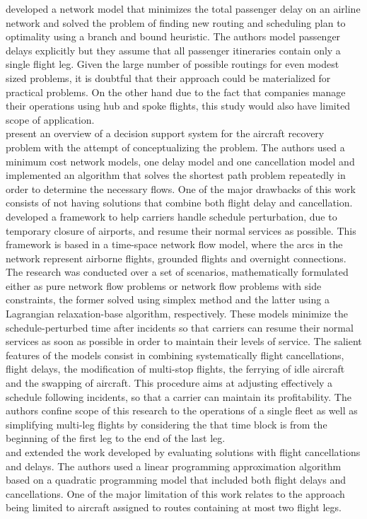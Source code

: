 \documentclass[ijoo,nonblindrev]{informs-ijoo}
\begin{document}
\citep{TEODOROVIC1984} developed a network model that minimizes the total passenger delay on an airline network and solved the problem of finding new routing and scheduling plan to optimality using a branch and bound heuristic. The authors model passenger delays explicitly but they assume that all passenger itineraries contain only a single flight leg. Given the large number of possible routings for even modest sized problems, it is doubtful that their approach could be materialized for practical problems. On the other hand due to the fact that companies manage their operations using hub and spoke flights, this study would also have limited scope of application.\\
\citep{Jarrah1993} present an overview of a decision support system for the aircraft recovery problem with the attempt of conceptualizing the problem. The authors used a minimum cost network models, one delay model and one cancellation model and implemented an algorithm that solves the shortest path problem repeatedly in order to determine the necessary flows. One of the major drawbacks of this work consists of not having solutions that combine both flight delay and cancellation.
\citep{Yan1997} developed a framework to help carriers handle schedule perturbation, due to temporary closure of airports, and resume their normal services as possible. This framework is based in a time-space network flow model, where the arcs in the network represent airborne flights, grounded flights and overnight connections. The research was conducted over a set of scenarios, mathematically formulated either as pure network flow problems or network flow problems with side constraints, the former solved using simplex method and the latter using a Lagrangian relaxation-base algorithm, respectively. These models minimize the schedule-perturbed time after incidents so that carriers can resume their normal services as soon as possible in order to maintain their levels of service. The salient features of the models consist in combining systematically flight cancellations, flight delays, the modification of multi-stop flights, the ferrying of idle aircraft and the swapping of aircraft. This procedure aims at adjusting effectively a schedule following incidents, so that a carrier can maintain its profitability.  The authors confine scope of this research to the operations of a single fleet as well as simplifying multi-leg flights by considering the that time block is from the beginning of the first leg to the end of the last leg.\\
\citep{Cao1997-I} and \citep{Cao1997-II} extended the work developed by \cite{Jarrah1993} evaluating solutions with flight cancellations and delays. The authors used a linear programming approximation algorithm based on   a quadratic programming model that included both flight delays and cancellations. One of the major limitation of this work relates to the approach being limited to aircraft assigned to routes containing at most two flight legs.\\
\end{document}

